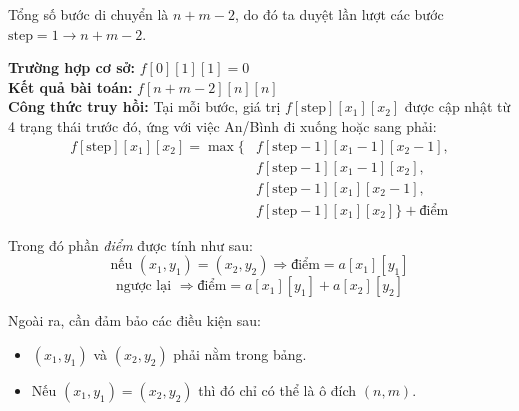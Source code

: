 Tổng số bước di chuyển là $n + m - 2$, do đó ta duyệt lần lượt các bước $\text{step} = 1 \rightarrow n + m - 2$.

\textbf{Trường hợp cơ sở:} $f[0][1][1] = 0$\\

\textbf{Kết quả bài toán:} $f[n + m - 2][n][n]$\\

\textbf{Công thức truy hồi:}  
Tại mỗi bước, giá trị $f[\text{step}][x_1][x_2]$ được cập nhật từ 4 trạng thái trước đó, ứng với việc An/Bình đi xuống hoặc sang phải:
\[
\begin{aligned}
f[\text{step}][x_1][x_2] = \max \Big\{ 
   & f[\text{step} - 1][x_1 - 1][x_2 - 1], \\
   & f[\text{step} - 1][x_1 - 1][x_2], \\
   & f[\text{step} - 1][x_1][x_2 - 1], \\
   & f[\text{step} - 1][x_1][x_2] 
\Big\} + \text{điểm}
\end{aligned}
\]

Trong đó phần \textit{điểm} được tính như sau:
\[
\text{nếu } (x_1, y_1) = (x_2, y_2) \Rightarrow \text{điểm} = a[x_1][y_1]
\]
\[
\text{ngược lại } \Rightarrow \text{điểm} = a[x_1][y_1] + a[x_2][y_2]
\]

Ngoài ra, cần đảm bảo các điều kiện sau:
\begin{itemize}
    \item $(x_1, y_1)$ và $(x_2, y_2)$ phải nằm trong bảng.
    \item Nếu $(x_1, y_1) = (x_2, y_2)$ thì đó chỉ có thể là ô đích $(n,m)$.
\end{itemize}


